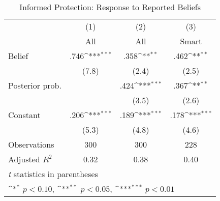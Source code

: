 \begin{table}[htbp]\centering
\def\sym#1{\ifmmode^{#1}\else\(^{#1}\)\fi}
\caption{Informed Protection: Response to Reported Beliefs}
\begin{tabular}{l*{3}{c}}
\hline\hline
                &\multicolumn{1}{c}{(1)}&\multicolumn{1}{c}{(2)}&\multicolumn{1}{c}{(3)}\\
                &\multicolumn{1}{c}{All}&\multicolumn{1}{c}{All}&\multicolumn{1}{c}{Smart}\\
\hline
Belief          &     .746\sym{***}&     .358\sym{**} &     .462\sym{**} \\
                &    (7.8)         &    (2.4)         &    (2.5)         \\
Posterior prob. &                  &     .424\sym{***}&     .367\sym{**} \\
                &                  &    (3.5)         &    (2.6)         \\
Constant        &     .206\sym{***}&     .189\sym{***}&     .178\sym{***}\\
                &    (5.3)         &    (4.8)         &    (4.6)         \\
\hline
Observations    &      300         &      300         &      228         \\
Adjusted \(R^{2}\)&     0.32         &     0.38         &     0.40         \\
\hline\hline
\multicolumn{4}{l}{\footnotesize \textit{t} statistics in parentheses}\\
\multicolumn{4}{l}{\footnotesize \sym{*} \(p<0.10\), \sym{**} \(p<0.05\), \sym{***} \(p<0.01\)}\\
\end{tabular}
\end{table}
